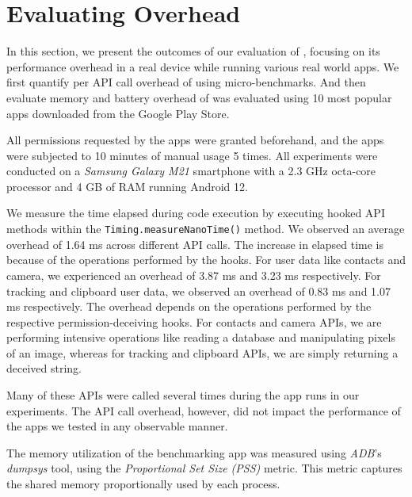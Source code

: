 \newpage
\section{Evaluating Overhead}
\label{sec:results}

In this section, we present the outcomes of our evaluation of \framework{}, focusing on its performance overhead in a real device while running various real world apps.  We first quantify per API call overhead of \framework{} using micro-benchmarks. And then evaluate memory and battery overhead of \framework{} was evaluated using 10 most popular apps downloaded from the Google Play Store.

All permissions requested by the apps were granted beforehand, and the apps were subjected to 10 minutes of manual usage 5 times. All experiments were conducted on a \textit{Samsung Galaxy M21} smartphone with a 2.3 GHz octa-core processor and 4 GB of RAM running Android 12. 

We measure the time elapsed during code execution by executing hooked API methods within the \texttt{Timing.measureNanoTime()} method. We observed an average overhead of 1.64 ms across different API calls. The increase in elapsed time is because of the operations performed by the hooks. For user data like contacts and camera, we experienced an overhead of 3.87 ms and 3.23 ms respectively. For tracking and clipboard user data, we observed an overhead of 0.83 ms and 1.07 ms respectively. The overhead depends on the operations performed by the respective permission-deceiving hooks. For contacts and camera APIs, we are performing intensive operations like reading a database and manipulating pixels of an image, whereas for tracking and clipboard APIs, we are simply returning a deceived string.

Many of these APIs were called several times during the app runs in our experiments. The API call overhead, however, did not impact the performance of the apps we tested in any observable manner.

The memory utilization of the benchmarking app was measured using \textit{ADB}'s \textit{dumpsys} tool, using the \textit{Proportional Set Size (PSS)} metric. This metric captures the shared memory proportionally used by each process.

